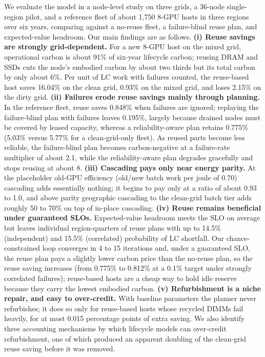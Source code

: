 \documentclass{article} %
\begin{document}
We evaluate the model in a node-level study on three grids, a 36-node single-region pilot, and a reference fleet of about 1,750 8-GPU hosts in three regions over six years, comparing against a no-reuse fleet, a failure-blind reuse plan, and expected-value headroom. Our main findings are as follows. \textbf{(i) Reuse savings are strongly grid-dependent.} For a new 8-GPU host on the mixed grid, operational carbon is about 91\% of six-year lifecycle carbon; reusing DRAM and SSDs cuts the node's embodied carbon by about two thirds but its total carbon by only about 6\%. Per unit of LC work with failures counted, the reuse-based host saves 16.04\% on the clean grid, 0.93\% on the mixed grid, and loses 2.15\% on the dirty grid. \textbf{(ii) Failures erode reuse savings mainly through planning.} In the reference fleet, reuse saves 0.848\% when failures are ignored; replaying the failure-blind plan with failures leaves 0.195\%, largely because drained nodes must be covered by leased capacity, whereas a reliability-aware plan retains 0.775\% (5.03\% versus 5.77\% for a clean-grid-only fleet). As reused parts become less reliable, the failure-blind plan becomes carbon-negative at a failure-rate multiplier of about 2.1, while the reliability-aware plan degrades gracefully and stops reusing at about 8. \textbf{(iii) Cascading pays only near energy parity.} At the placeholder old-GPU efficiency (old/new batch work per joule of 0.70) cascading adds essentially nothing; it begins to pay only at a ratio of about 0.93 to 1.0, and above parity geographic cascading to the clean-grid batch tier adds roughly 50 to 70\% on top of in-place cascading. \textbf{(iv) Reuse remains beneficial under guaranteed SLOs.} Expected-value headroom meets the SLO on average but leaves individual region-quarters of reuse plans with up to 14.5\% (independent) and 15.5\% (correlated) probability of LC shortfall. Our chance-constrained loop converges in 4 to 15 iterations and, under a guaranteed SLO, the reuse plan pays a slightly lower carbon price than the no-reuse plan, so the reuse saving increases (from 0.775\% to 0.812\% at a 0.1\% target under strongly correlated failures); reuse-based hosts are a cheap way to hold idle reserve because they carry the lowest embodied carbon. \textbf{(v) Refurbishment is a niche repair, and easy to over-credit.} With baseline parameters the planner never refurbishes; it does so only for reuse-based hosts whose recycled DIMMs fail heavily, for at most 0.015 percentage points of extra saving. We also identify three accounting mechanisms by which lifecycle models can over-credit refurbishment, one of which produced an apparent doubling of the clean-grid reuse saving before it was removed.
\end{document}
